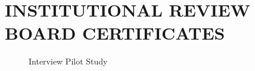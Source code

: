 %
%
%
%	 
%



\chapter{\uppercase{Institutional Review Board Certificates}}\label{appendix:A}

\begin{figure}[h]
\centering
{}
\caption{Interview Pilot Study}
\end{figure}

\pagebreak{}


